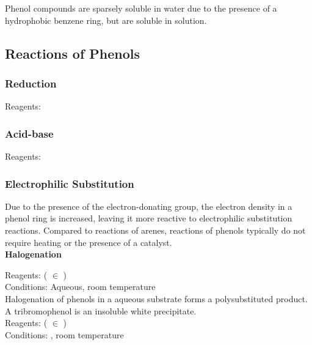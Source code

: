 \documentclass[../main]{subfiles}
\begin{document}
	Phenol compounds are sparsely soluble in water due to the presence of a hydrophobic benzene ring, but are soluble in  solution. \\

	\subsection{Reactions of Phenols}

	\subsubsection{Reduction}

	Reagents:  \\


	\subsubsection{Acid-base}

	Reagents:  \\


	\subsubsection{Electrophilic Substitution}

	Due to the presence of the electron-donating  group, the electron density in a phenol ring is increased, leaving it more reactive to electrophilic substitution reactions. Compared to reactions of arenes, reactions of phenols typically do not require heating or the presence of a catalyst. \\

	\noindent \textbf{Halogenation}

	Reagents:  ( \(\in\) ) \\
	Conditions:  Aqueous, room temperature\\

	Halogenation of phenols in a aqueous substrate forms a polysubstituted product. A tribromophenol is an insoluble white precipitate. \\

	Reagents:  ( \(\in\) ) \\
	Conditions: , room temperature\\
\end{document}
